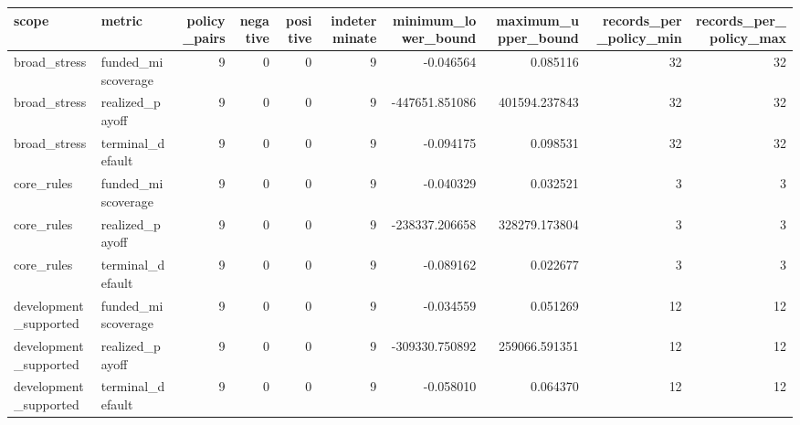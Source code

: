 \begin{tabular}{llrrrrrrrr}
\toprule
scope & metric & policy\_pairs & negative & positive & indeterminate & minimum\_lower\_bound & maximum\_upper\_bound & records\_per\_policy\_min & records\_per\_policy\_max \\
\midrule
broad\_stress & funded\_miscoverage & 9 & 0 & 0 & 9 & -0.046564 & 0.085116 & 32 & 32 \\
broad\_stress & realized\_payoff & 9 & 0 & 0 & 9 & -447651.851086 & 401594.237843 & 32 & 32 \\
broad\_stress & terminal\_default & 9 & 0 & 0 & 9 & -0.094175 & 0.098531 & 32 & 32 \\
core\_rules & funded\_miscoverage & 9 & 0 & 0 & 9 & -0.040329 & 0.032521 & 3 & 3 \\
core\_rules & realized\_payoff & 9 & 0 & 0 & 9 & -238337.206658 & 328279.173804 & 3 & 3 \\
core\_rules & terminal\_default & 9 & 0 & 0 & 9 & -0.089162 & 0.022677 & 3 & 3 \\
development\_supported & funded\_miscoverage & 9 & 0 & 0 & 9 & -0.034559 & 0.051269 & 12 & 12 \\
development\_supported & realized\_payoff & 9 & 0 & 0 & 9 & -309330.750892 & 259066.591351 & 12 & 12 \\
development\_supported & terminal\_default & 9 & 0 & 0 & 9 & -0.058010 & 0.064370 & 12 & 12 \\
\bottomrule
\end{tabular}
